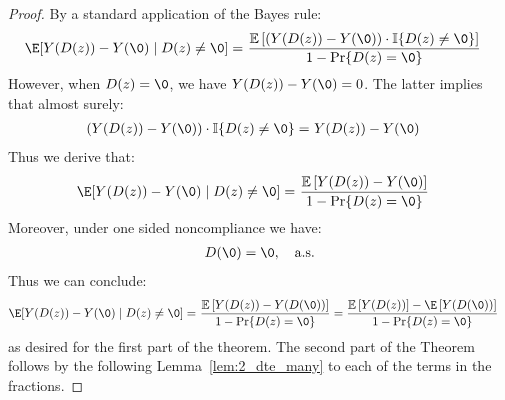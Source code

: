 \begin{proof}
By a standard application of the Bayes rule:
\begin{align*}
\E[Y(D(z)) - Y(\0) \mid D(z) \neq \0]
=~&\frac{
    \mathbb{E}\left[
      \left( Y(D(z)) - Y(\0) \right) 
      \cdot \mathbb{I} \{ D(z)\neq \0 \}
    \right]
  }{ 1 - \Pr\{ D(z)=\0 \} }
\end{align*}
However, when $D(z)=\0$, we have $Y(D(z)) - Y(\0)=0$. 
The latter implies that almost surely:
\begin{align*}
    \left( Y(D(z)) - Y(\0) \right) 
      \cdot \mathbb{I} \{ D(z)\neq \0 \} 
      =~& Y(D(z)) - Y(\0) 
\end{align*}
Thus we derive that:
\begin{align*}
 \E[Y(D(z)) - Y(\0) \mid D(z) \neq \0]=~& \frac{
    \mathbb{E}\left[ Y(D(z)) - Y(\0) \right]
  }{ 1 - \Pr\{ D(z)=\0 \} }
\end{align*}
Moreover, under one sided noncompliance we have:
\begin{align*}
    D(\0) = \0, \quad \text{a.s.}
\end{align*}
Thus we can conclude:
\begin{align*}
 \E[Y(D(z)) - Y(\0) \mid D(z) \neq \0]=~& \frac{
    \mathbb{E}\left[ Y(D(z)) - Y(D(\0)) \right]
  }{ 1 - \Pr\{ D(z)=\0 \} }=\frac{
    \mathbb{E}\left[ Y(D(z))\right] - \E\left[Y(D(\0)) \right]
  }{ 1 - \Pr\{ D(z)=\0 \} }
\end{align*}
as desired for the first part of the theorem.
The second part of the Theorem follows by the following Lemma~\ref{lem:2_dte_many} to each of the terms in the fractions.
\end{proof}

